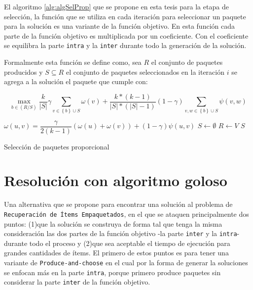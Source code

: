 El algoritmo \ref{alg:algSelProp} que se propone en esta tesis para la etapa de selección, la función que se utiliza en cada iteración para seleccionar un paquete para la solución es una variante de la función objetivo. En esta función cada parte de la función objetivo es multiplicada por un coeficiente. Con el coeficiente se equilibra la parte \texttt{intra} y la \texttt{inter} durante todo la generación de la solución.   

Formalmente esta función se define como, sea $R$ el conjunto de paquetes producidos y $S \subseteq R$ el conjunto de paquetes seleccionados en la iteración $i$ se agrega a la solución el paquete que cumple con:

\begin{equation}
\max_{b \in (R/S)}{\dfrac{k}{|S|}} \gamma \sum_{v \in \left\{b\right\} \cup S}{\omega(v)} + \dfrac{k * (k-1)}{|S| * (|S|-1)} (1-\gamma) \sum_{v,w \in \left\{b\right\} \cup S}{\psi(v,w)}
\end{equation}

\begin{center}
	\begin{algorithm}[H]
	\DontPrintSemicolon
	\SetAlgoLined
		$\omega(u,v) = \dfrac{\gamma}{2( k - 1)} (\omega(u) + \omega(v)) + (1 - \gamma)\psi(u,v)$\;
		$S \leftarrow \emptyset$\;
		$R \leftarrow V$\;
		\Return $S$\;
	\caption{Selección de paquetes proporcional}\label{alg:algSelProp}
	\end{algorithm}
\end{center}

\section{Resolución con algoritmo goloso}

Una alternativa que se propone para encontrar una solución al problema de \texttt{Recuperación de Ítems Empaquetados}, en el que se ataquen principalmente dos puntos: (1)que la solución se construya de forma tal que tenga la misma consideración las dos partes de la función objetivo -la parte \texttt{inter} y la \texttt{intra}- durante todo el proceso y (2)que sea aceptable el tiempo de ejecución para grandes cantidades de ítems. El primero de estos puntos es para tener una variante de \texttt{Produce-and-choose} en el cual por la forma de generar la soluciones se enfocan más en la parte \texttt{intra}, porque primero produce paquetes sin considerar la parte \texttt{inter} de la función objetivo.

